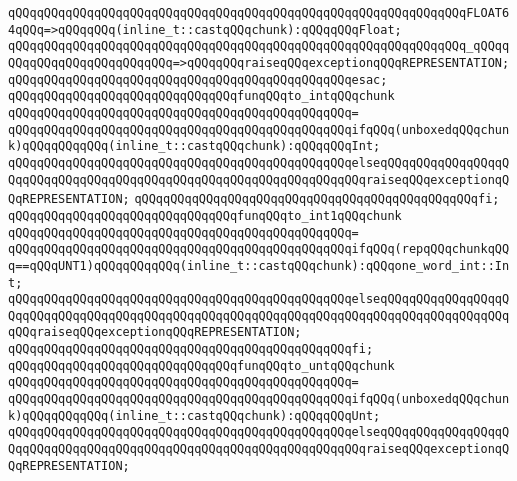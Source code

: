 \verb|qQQqqQQqqQQqqQQqqQQqqQQqqQQqqQQqqQQqqQQqqQQqqQQqqQQqqQQqqQQqqQQqFLOAT64qQQq=>qQQqqQQq(inline_t::castqQQqchunk):qQQqqQQqFloat;|\newline
\verb|qQQqqQQqqQQqqQQqqQQqqQQqqQQqqQQqqQQqqQQqqQQqqQQqqQQqqQQqqQQqqQQq_qQQqqQQqqQQqqQQqqQQqqQQqqQQq=>qQQqqQQqraiseqQQqexceptionqQQqREPRESENTATION;|\newline
\verb|qQQqqQQqqQQqqQQqqQQqqQQqqQQqqQQqqQQqqQQqqQQqqQQqesac;|\newline
\newline
\verb|qQQqqQQqqQQqqQQqqQQqqQQqqQQqqQQqfunqQQqto_intqQQqchunk|\newline
\verb|qQQqqQQqqQQqqQQqqQQqqQQqqQQqqQQqqQQqqQQqqQQqqQQq=|\newline
\verb|qQQqqQQqqQQqqQQqqQQqqQQqqQQqqQQqqQQqqQQqqQQqqQQqifqQQq(unboxedqQQqchunk)qQQqqQQqqQQq(inline_t::castqQQqchunk):qQQqqQQqInt;|\newline
\verb|qQQqqQQqqQQqqQQqqQQqqQQqqQQqqQQqqQQqqQQqqQQqqQQqelseqQQqqQQqqQQqqQQqqQQqqQQqqQQqqQQqqQQqqQQqqQQqqQQqqQQqqQQqqQQqqQQqqQQqraiseqQQqexceptionqQQqREPRESENTATION;|\newline
\verb|qQQqqQQqqQQqqQQqqQQqqQQqqQQqqQQqqQQqqQQqqQQqqQQqfi;|\newline
\newline
\verb|qQQqqQQqqQQqqQQqqQQqqQQqqQQqqQQqfunqQQqto_int1qQQqchunk|\newline
\verb|qQQqqQQqqQQqqQQqqQQqqQQqqQQqqQQqqQQqqQQqqQQqqQQq=|\newline
\verb|qQQqqQQqqQQqqQQqqQQqqQQqqQQqqQQqqQQqqQQqqQQqqQQqifqQQq(repqQQqchunkqQQq==qQQqUNT1)qQQqqQQqqQQq(inline_t::castqQQqchunk):qQQqone_word_int::Int;|\newline
\verb|qQQqqQQqqQQqqQQqqQQqqQQqqQQqqQQqqQQqqQQqqQQqqQQqelseqQQqqQQqqQQqqQQqqQQqqQQqqQQqqQQqqQQqqQQqqQQqqQQqqQQqqQQqqQQqqQQqqQQqqQQqqQQqqQQqqQQqqQQqqQQqraiseqQQqexceptionqQQqREPRESENTATION;|\newline
\verb|qQQqqQQqqQQqqQQqqQQqqQQqqQQqqQQqqQQqqQQqqQQqqQQqfi;|\newline
\newline
\verb|qQQqqQQqqQQqqQQqqQQqqQQqqQQqqQQqfunqQQqto_untqQQqchunk|\newline
\verb|qQQqqQQqqQQqqQQqqQQqqQQqqQQqqQQqqQQqqQQqqQQqqQQq=|\newline
\verb|qQQqqQQqqQQqqQQqqQQqqQQqqQQqqQQqqQQqqQQqqQQqqQQqifqQQq(unboxedqQQqchunk)qQQqqQQqqQQq(inline_t::castqQQqchunk):qQQqqQQqUnt;|\newline
\verb|qQQqqQQqqQQqqQQqqQQqqQQqqQQqqQQqqQQqqQQqqQQqqQQqelseqQQqqQQqqQQqqQQqqQQqqQQqqQQqqQQqqQQqqQQqqQQqqQQqqQQqqQQqqQQqqQQqqQQqraiseqQQqexceptionqQQqREPRESENTATION;|\newline
